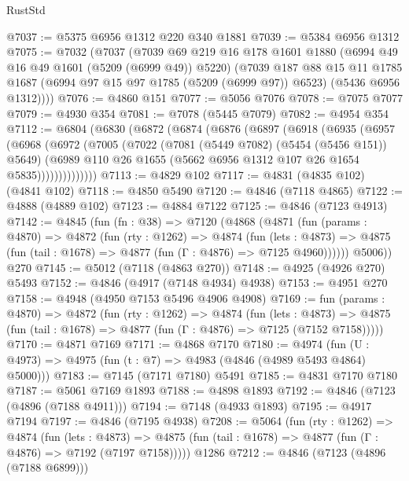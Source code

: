 \begin{lexlean}{RustStd}
\begin{coremodule}
@7037 := @5375 @6956 @1312 @220 @340 @1881
@7039 := @5384 @6956 @1312
@7075 := @7032
    (@7037
      (@7039
        @69
        @219
        @16
        @178
        @1601
        @1880
        (@6994 @49 @16 @49 @1601 (@5209 (@6999 @49)) @5220)
        (@7039
          @187
          @88
          @15
          @11
          @1785
          @1687
          (@6994 @97 @15 @97 @1785 (@5209 (@6999 @97)) @6523)
          (@5436 @6956 @1312))))
@7076 := @4860 @151
@7077 := @5056 @7076
@7078 := @7075 @7077
@7079 := @4930 @354
@7081 := @7078 (@5445 @7079)
@7082 := @4954 @354
@7112 := @6804
    (@6830
      (@6872
        (@6874
          (@6876
            (@6897
              (@6918
                (@6935
                  (@6957
                    (@6968
                      (@6972
                        (@7005
                          (@7022
                            (@7081 (@5449 @7082) (@5454 (@5456 @151)) @5649)
                            (@6989
                              @110
                              @26
                              @1655
                              (@5662 @6956 @1312 @107 @26 @1654 @5835))))))))))))))
@7113 := @4829 @102
@7117 := @4831 (@4835 @102) (@4841 @102)
@7118 := @4850 @5490
@7120 := @4846 (@7118 @4865)
@7122 := @4888 (@4889 @102)
@7123 := @4884 @7122
@7125 := @4846 (@7123 @4913)
@7142 := @4845
    (fun (fn : @38) =>
    @7120
      (@4868
        (@4871
          (fun (params : @4870) =>
          @4872
            (fun (rty : @1262) =>
            @4874
              (fun (lets : @4873) =>
              @4875 (fun (tail : @1678) => @4877 (fun (Γ : @4876) => @7125 @4960))))))
        @5006))
    @270
@7145 := @5012 (@7118 (@4863 @270))
@7148 := @4925 (@4926 @270) @5493
@7152 := @4846 (@4917 (@7148 @4934) @4938)
@7153 := @4951 @270
@7158 := @4948 (@4950 @7153 @5496 @4906 @4908)
@7169 := fun (params : @4870) =>
  @4872
    (fun (rty : @1262) =>
    @4874
      (fun (lets : @4873) =>
      @4875 (fun (tail : @1678) => @4877 (fun (Γ : @4876) => @7125 (@7152 @7158)))))
@7170 := @4871 @7169
@7171 := @4868 @7170
@7180 := @4974 (fun (U : @4973) => @4975 (fun (t : @7) => @4983 (@4846 (@4989 @5493 @4864) @5000)))
@7183 := @7145 (@7171 @7180) @5491
@7185 := @4831 @7170 @7180
@7187 := @5061 @7169 @1893
@7188 := @4898 @1893
@7192 := @4846 (@7123 (@4896 (@7188 @4911)))
@7194 := @7148 (@4933 @1893)
@7195 := @4917 @7194
@7197 := @4846 (@7195 @4938)
@7208 := @5064
    (fun (rty : @1262) =>
    @4874
      (fun (lets : @4873) =>
      @4875 (fun (tail : @1678) => @4877 (fun (Γ : @4876) => @7192 (@7197 @7158)))))
    @1286
@7212 := @4846 (@7123 (@4896 (@7188 @6899)))

\end{coremodule}
\end{lexlean}
